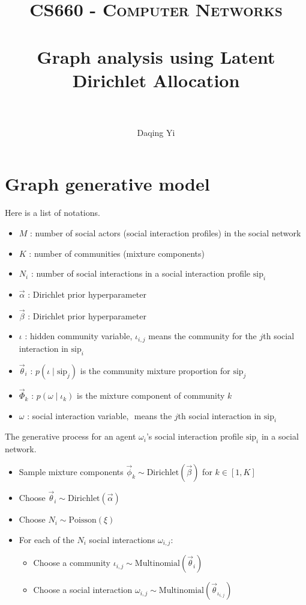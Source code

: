 \documentclass[paper=a4, fontsize=11pt]{scrartcl}
\title{
		\usefont{OT1}{bch}{b}{n}
		\normalfont \normalsize \textsc{CS660 - Computer Networks} \\ [25pt]
		\horrule{0.5pt} \\[0.4cm]
		\huge Graph analysis using Latent Dirichlet Allocation \\
		\horrule{2pt} \\[0.5cm]
}
\author{
		\normalfont %
        Daqing Yi \\
}
\begin{document}
\maketitle

\section{Graph generative model}

Here is a list of notations.
\begin{itemize}
\item $ M $ : number of social actors (social interaction profiles) in the social network
\item $ K $ : number of communities (mixture components)
\item $ N_{i} $ : number of social interactions in a social interaction profile $ \mbox{sip}_{i} $
\item $ \vec{\alpha} $ : Dirichlet prior hyperparameter
\item $ \vec{\beta} $ : Dirichlet prior hyperparameter
\item $ \iota $ : hidden community variable, $ \iota_{i,j} $ means the community for the $ j $th social interaction in $ \mbox{sip}_{i} $
\item $ \vec{\theta}_{i} $ : $ p(\iota \mid \mbox{sip}_{j}) $ is the community mixture proportion for $ \mbox{sip}_{j} $ 
\item $ \vec{\Phi}_{k} $ : $ p(\omega \mid \iota_{k} ) $ is the mixture component of community $ k $
\item $ \omega $ : social interaction variable, $ $ means the $ j $th social interaction in $ \mbox{sip}_{i} $
\end{itemize}

The generative process for an agent $ \omega_{i} $'s social interaction profile $ \mbox{sip}_{i} $ in a social network.
\begin{itemize}
\item Sample mixture components $ \vec{\phi}_{k} \sim \mbox{Dirichlet}(\vec{\beta}) $ for $ k \in [1, K] $
\item Choose $ \vec{\theta}_{i} \sim \mbox{Dirichlet}(\vec{\alpha}) $ 
\item Choose $ N_{i}  \sim \mbox{Poisson}(\xi) $
\item For each of the $ N_{i} $ social interactions $ \omega_{i,j} $:
	\begin{itemize}
		\item Choose a community $ \iota_{i,j} \sim \mbox{Multinomial}( \vec{\theta}_{i} ) $
		\item Choose a social interaction $ \omega_{i,j} \sim \mbox{Multinomial}( \vec{\theta}_{\iota_{i,j}} ) $	
	\end{itemize}
\end{itemize}
\end{document}
